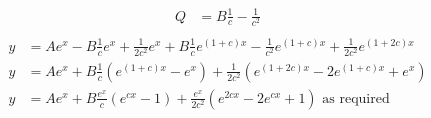 \documentclass[10pt,\jkfside,a4paper]{article}
\begin{document}
\begin{enumerate}
\begin{enumerate}
\begin{equation}
\begin{split}
Q &= B\frac{1}{c} - \frac{1}{c^2}\\
\end{split}
\end{equation}
\begin{equation}
\begin{split}
y &= Ae^x - B\frac{1}{c}e^x + \frac{1}{2c^2} e^x + B\frac{1}{c}e^{(1 + c)x} - \frac{1}{c^2}e^{(1 + c)x} + \frac{1}{2c^2}e^{(1 + 2c)x}\\
y &= Ae^x + B\frac{1}{c}(e^{(1 + c)x} - e^x) + \frac{1}{2c^2}(e^{(1 + 2c)x} - 2e^{(1 + c)x} + e^x)\\
y &= Ae^x + B\frac{e^x}{c}(e^{cx} - 1) + \frac{e^x}{2c^2}(e^{2cx} - 2e^{cx} + 1) \text{ as required}\\
\end{split}
\end{equation}


\end{enumerate}
\end{enumerate}
\end{document}

